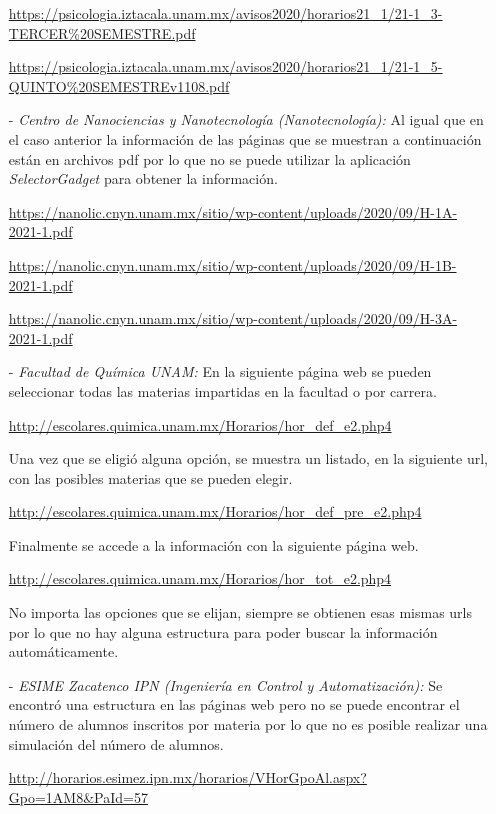 \begin{itemize}

\url{https://psicologia.iztacala.unam.mx/avisos2020/horarios21_1/21-1_3-TERCER\%20SEMESTRE.pdf}

\url{https://psicologia.iztacala.unam.mx/avisos2020/horarios21_1/21-1_5-QUINTO\%20SEMESTREv1108.pdf}

\item[-] \textit{Centro de Nanociencias y Nanotecnología (Nanotecnología):} Al igual que en el caso anterior la información de las páginas que se muestran a continuación están en archivos pdf por lo que no se puede utilizar la aplicación \textit{SelectorGadget} para obtener la información.

\url{https://nanolic.cnyn.unam.mx/sitio/wp-content/uploads/2020/09/H-1A-2021-1.pdf}

\url{https://nanolic.cnyn.unam.mx/sitio/wp-content/uploads/2020/09/H-1B-2021-1.pdf}

\url{https://nanolic.cnyn.unam.mx/sitio/wp-content/uploads/2020/09/H-3A-2021-1.pdf}

\item[-] \textit{Facultad de Química UNAM:} En la siguiente página web se pueden seleccionar todas las materias impartidas en la facultad o por carrera.

\url{http://escolares.quimica.unam.mx/Horarios/hor_def_e2.php4}

Una vez que se eligió alguna opción, se muestra un listado, en la siguiente url, con las posibles materias que se pueden elegir.

\url{http://escolares.quimica.unam.mx/Horarios/hor_def_pre_e2.php4}

Finalmente se accede a la información con la siguiente página web.

\url{http://escolares.quimica.unam.mx/Horarios/hor_tot_e2.php4}

No importa las opciones que se elijan, siempre se obtienen esas mismas urls por lo que no hay alguna estructura para poder buscar la información automáticamente.


\item[-] \textit{ESIME Zacatenco IPN (Ingeniería en Control y Automatización):} Se encontró una estructura en las páginas web pero no se puede encontrar el número de alumnos inscritos por materia por lo que no es posible realizar una simulación del número de alumnos.

\url{http://horarios.esimez.ipn.mx/horarios/VHorGpoAl.aspx?Gpo=1AM8&PaId=57}


\end{itemize}
